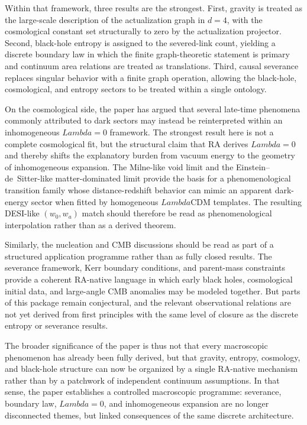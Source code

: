 \documentclass[11pt]{article}
\def\Lambda{Lambda}%
\begin{document}
Within that framework, three results are the strongest. First, gravity is treated as the large-scale description of the actualization graph in $d=4$, with the cosmological constant set structurally to zero by the actualization projector. Second, black-hole entropy is assigned to the severed-link count, yielding a discrete boundary law in which the finite graph-theoretic statement is primary and continuum area relations are treated as translations. Third, causal severance replaces singular behavior with a finite graph operation, allowing the black-hole, cosmological, and entropy sectors to be treated within a single ontology.

On the cosmological side, the paper has argued that several late-time phenomena commonly attributed to dark sectors may instead be reinterpreted within an inhomogeneous $\Lambda=0$ framework. The strongest result here is not a complete cosmological fit, but the structural claim that RA derives $\Lambda=0$ and thereby shifts the explanatory burden from vacuum energy to the geometry of inhomogeneous expansion. The Milne-like void limit and the Einstein--de~Sitter-like matter-dominated limit provide the basis for a phenomenological transition family whose distance-redshift behavior can mimic an apparent dark-energy sector when fitted by homogeneous $\Lambda$CDM templates. The resulting DESI-like $(w_0,w_a)$ match should therefore be read as phenomenological interpolation rather than as a derived theorem.

Similarly, the nucleation and CMB discussions should be read as part of a structured application programme rather than as fully closed results. The severance framework, Kerr boundary conditions, and parent-mass constraints provide a coherent RA-native language in which early black holes, cosmological initial data, and large-angle CMB anomalies may be modeled together. But parts of this package remain conjectural, and the relevant observational relations are not yet derived from first principles with the same level of closure as the discrete entropy or severance results.

The broader significance of the paper is thus not that every macroscopic phenomenon has already been fully derived, but that gravity, entropy, cosmology, and black-hole structure can now be organized by a single RA-native mechanism rather than by a patchwork of independent continuum assumptions. In that sense, the paper establishes a controlled macroscopic programme: severance, boundary law, $\Lambda=0$, and inhomogeneous expansion are no longer disconnected themes, but linked consequences of the same discrete architecture.
\end{document}
